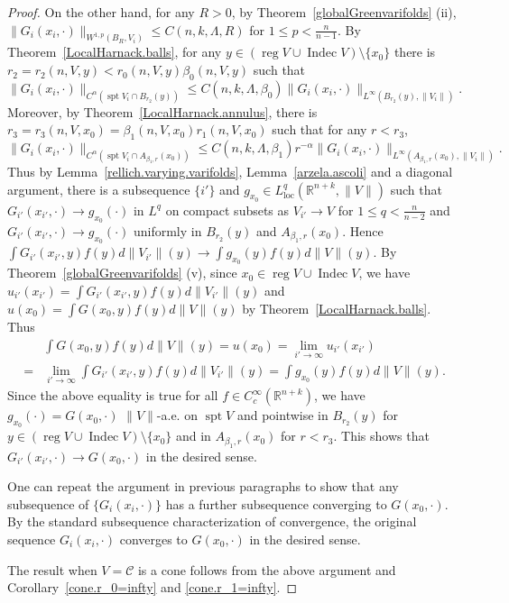 \documentclass[11pt]{amsart}
\theoremstyle{definition}
\newcommand{\R}{\mathbb{R}}
\newcommand{\C}{\mathcal{C}}
\newcommand{\loc}{\mathrm{loc}}
\DeclareMathOperator{\spt}{spt}
\DeclareMathOperator{\reg}{reg}
\DeclareMathOperator{\indec}{Indec}
\begin{document}
\begin{proof}
	On the other hand, for any $R>0$, by Theorem~\ref{globalGreenvarifolds} (ii), $\|G_i(x_i,\cdot)\|_{W^{1,p}(B_R,V_i)}\le C(n,k,\Lambda,R)$ for $1\le p<\frac{n}{n-1}$. By Theorem~\ref{LocalHarnack.balls}, for any $y\in (\reg V\cup\indec V) \setminus\{x_0\}$ there is $r_2=r_2(n,V,y)<r_0(n,V,y)\beta_0(n,V,y)$ such that \[\|G_i(x_i,\cdot)\|_{C^\alpha(\spt V_i\cap B_{r_2}(y))}\le C(n,k,\Lambda,\beta_0)\|G_i(x_i,\cdot)\|_{L^\infty( B_{r_2}(y),\|V_i\|)}.\] Moreover, by Theorem~\ref{LocalHarnack.annulus}, there is $r_3=r_3(n,V,x_0)=\beta_1(n,V,x_0)r_1(n,V,x_0)$ such that for any $r<r_3$, \[\|G_i(x_i,\cdot)\|_{C^\alpha(\spt V_i\cap A_{\beta_1,r}(x_0))}\le C(n,k,\Lambda,\beta_1)r^{-\alpha}\|G_i(x_i,\cdot)\|_{L^\infty( A_{\beta_1,r}(x_0),\|V_i\|)}.\] Thus by Lemma~\ref{rellich.varying.varifolds}, Lemma~\ref{arzela.ascoli} and a diagonal argument, there is a subsequence $\{i'\}$ and $g_{x_0}\in L^q_\loc(\R^{n+k},\|V\|)$ such that $G_{i'}(x_{i'},\cdot)\to g_{x_0}(\cdot)$ in $L^q$ on compact subsets as $V_{i'}\to V$ for $1\le q<\frac{n}{n-2}$ and $G_{i'}(x_{i'},\cdot)\to g_{x_0}(\cdot)$ uniformly in $B_{r_2}(y)$ and $A_{\beta_1,r}(x_0)$. 
	Hence $\int G_{i'}(x_{i'},y)f(y)d\|V_{i'}\|(y)\to \int g_{x_0}(y)f(y)d\|V\|(y)$. By Theorem~\ref{globalGreenvarifolds} (v), since $x_0\in \reg V\cup\indec V$, we have $u_{i'}(x_{i'})=\int G_{i'}(x_{i'},y)f(y)d\|V_{i'}\|(y)$ and $u(x_0)=\int G(x_0,y)f(y)d\|V\|(y)$ by Theorem~\ref{LocalHarnack.balls}. Thus \[\begin{aligned}
		&\int G(x_0,y)f(y)d\|V\|(y)=u(x_0)=\lim_{i'\to\infty} u_{i'}(x_{i'})\\
		=&\lim_{i'\to\infty} \int G_{i'}(x_{i'},y)f(y)d\|V_{i'}\|(y)=\int g_{x_0}(y)f(y)d\|V\|(y).
	\end{aligned}\]Since the above equality is true for all $f\in C_c^\infty(\R^{n+k})$, we have $g_{x_0}(\cdot)=G(x_0,\cdot)$ $\|V\|$-a.e. on $ \spt V$ and pointwise in $B_{r_2}(y)$ for $y\in (\reg V\cup\indec V) \setminus\{x_0\}$ and in $A_{\beta_1,r}(x_0)$ for $r<r_3$.  This shows that $G_{i'}(x_{i'},\cdot)\to G(x_0,\cdot)$ in the desired sense.
	
	One can repeat the argument in previous paragraphs to show that any subsequence of $\{G_i(x_i,\cdot)\}$ has a further subsequence converging to $G(x_0,\cdot)$. By the standard subsequence characterization of convergence, the original sequence $G_i(x_i,\cdot)$ converges to $G(x_0,\cdot)$ in the desired sense.
	
    The result when $V=\C$ is a cone follows from the above argument and Corollary~\ref{cone.r_0=infty} and \ref{cone.r_1=infty}.
\end{proof}
\end{document}
